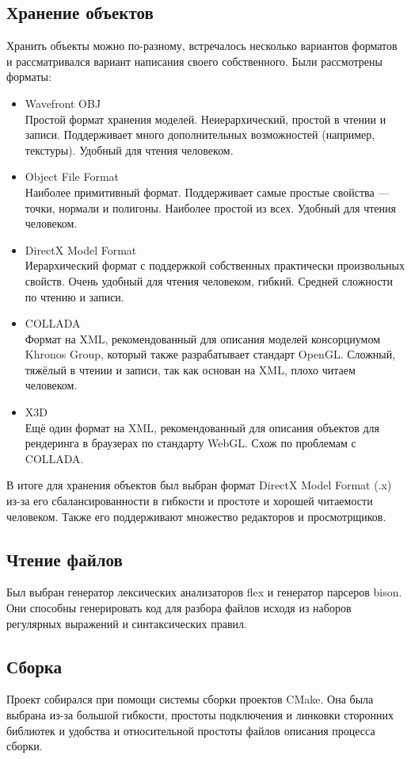 \documentclass[a4paper,12pt]{report}
\begin{document}
\subsection{Хранение объектов}
Хранить объекты можно по-разному, встречалось несколько вариантов форматов и рассматривался вариант написания своего собственного.
Были рассмотрены форматы:
\begin{itemize}
\item Wavefront OBJ \\
Простой формат хранения моделей. Неиерархический, простой в чтении и записи. Поддерживает много дополнительных возможностей (например, текстуры). Удобный для чтения человеком.
\item Object File Format \\
Наиболее примитивный формат. Поддерживает самые простые свойства --- точки, нормали и полигоны. Наиболее простой из всех. Удобный для чтения человеком.
\item DirectX Model Format \\
Иерархический формат с поддержкой собственных практически произвольных свойств. Очень удобный для чтения человеком, гибкий. Средней сложности по чтению и записи.
\item COLLADA \\
Формат на XML, рекомендованный для описания моделей консорциумом Khronos Group, который также разрабатывает стандарт OpenGL. Сложный, тяжёлый в чтении и записи, так как основан на XML, плохо читаем человеком.
\item X3D \\
Ещё один формат на XML, рекомендованный для описания объектов для рендеринга в браузерах по стандарту WebGL. Схож по проблемам с COLLADA.
\end{itemize}
В итоге для хранения объектов был выбран формат DirectX Model Format (.x) из-за его сбалансированности в гибкости и простоте и хорошей читаемости человеком. Также его поддерживают множество редакторов и просмотрщиков.

\subsection{Чтение файлов}

Был выбран генератор лексических анализаторов flex и генератор парсеров bison. Они способны генерировать код для разбора файлов исходя из наборов регулярных выражений и синтаксических правил.

\subsection{Сборка}
Проект собирался при помощи системы сборки проектов CMake. Она была выбрана из-за большой гибкости, простоты подключения и линковки сторонних библиотек и удобства и относительной простоты файлов описания процесса сборки.
\end{document}
